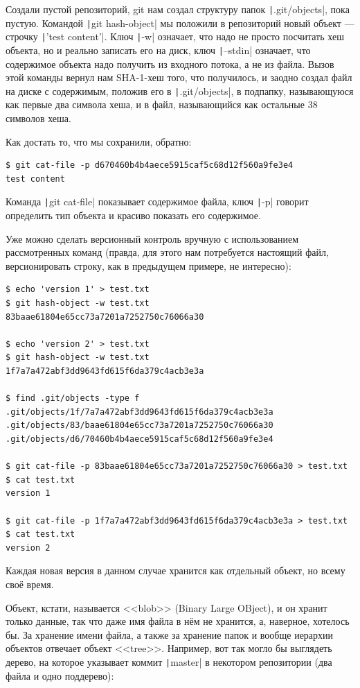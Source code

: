 \documentclass[a5paper]{article}
\begin{document}
Создали пустой репозиторий, git нам создал структуру папок \texttt|.git/objects|, пока пустую. Командой \texttt|git hash-object| мы положили в репозиторий новый объект --- строчку \texttt|'test content'|. Ключ \texttt|-w| означает, что надо не просто посчитать хеш объекта, но и реально записать его на диск, ключ \texttt|--stdin| означает, что содержимое объекта надо получить из входного потока, а не из файла. Вызов этой команды вернул нам SHA-1-хеш того, что получилось, и заодно создал файл на диске с содержимым, положив его в \texttt|.git/objects|, в подпапку, называющуюся как первые два символа хеша, и в файл, называющийся как остальные 38 символов хеша.

Как достать то, что мы сохранили, обратно:
\begin{verbatim}
$ git cat-file -p d670460b4b4aece5915caf5c68d12f560a9fe3e4
test content
\end{verbatim}

Команда \texttt|git cat-file| показывает содержимое файла, ключ \texttt|-p| говорит определить тип объекта и красиво показать его содержимое.

Уже можно сделать версионный контроль вручную с использованием рассмотренных команд (правда, для этого нам потребуется настоящий файл, версионировать строку, как в предыдущем примере, не интересно):

\begin{verbatim}
$ echo 'version 1' > test.txt
$ git hash-object -w test.txt
83baae61804e65cc73a7201a7252750c76066a30

$ echo 'version 2' > test.txt
$ git hash-object -w test.txt
1f7a7a472abf3dd9643fd615f6da379c4acb3e3a

$ find .git/objects -type f
.git/objects/1f/7a7a472abf3dd9643fd615f6da379c4acb3e3a
.git/objects/83/baae61804e65cc73a7201a7252750c76066a30
.git/objects/d6/70460b4b4aece5915caf5c68d12f560a9fe3e4

$ git cat-file -p 83baae61804e65cc73a7201a7252750c76066a30 > test.txt
$ cat test.txt
version 1

$ git cat-file -p 1f7a7a472abf3dd9643fd615f6da379c4acb3e3a > test.txt
$ cat test.txt
version 2
\end{verbatim}

Каждая новая версия в данном случае хранится как отдельный объект, но всему своё время.

Объект, кстати, называется <<blob>> (Binary Large OBject), и он хранит только данные, так что даже имя файла в нём не хранится, а, наверное, хотелось бы. За хранение имени файла, а также за хранение папок и вообще иерархии объектов отвечает объект <<tree>>. Например, вот так могло бы выглядеть дерево, на которое указывает коммит \texttt|master| в некотором репозитории (два файла и одно поддерево):
\end{document}
